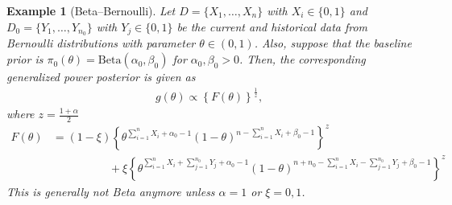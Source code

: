 \documentclass[12pt]{article}
\newtheorem{example}{Example}
\begin{document}
\begin{example}[Beta–Bernoulli]
    Let $D = \{X_1,\dots,X_n\}$ with $X_i \in \{0, 1\}$ and $D_0 = \{Y_1,\dots,Y_{n_0}\}$ with $Y_j \in \{0, 1\}$ be the current and historical data from Bernoulli distributions with parameter $\theta \in (0, 1)$.
    Also, suppose that the baseline prior is $\pi_0(\theta) = \mathrm{Beta}(\alpha_0, \beta_0)$ for $\alpha_0, \beta_0 > 0$.
    Then, the corresponding generalized power posterior is given as
    \begin{align*}
        g(\theta) \propto \left\{F(\theta)\right\}^{\frac{1}{z}},
    \end{align*}
    where $z = \frac{1 + \alpha}{2}$
    \begin{align*}
        F(\theta) &= (1 - \xi)\left\{\theta^{\sum^n_{i=1}X_i + \alpha_0 - 1}(1 - \theta)^{n - \sum^n_{i=1}X_i + \beta_0 - 1}\right\}^z \\
        &\quad\quad\quad\quad\quad + \xi\left\{\theta^{\sum^n_{i=1}X_i + \sum^{n_0}_{j=1}Y_j + \alpha_0 - 1}(1 - \theta)^{n + n_0 - \sum^n_{i=1}X_i - \sum^{n_0}_{j=1}Y_j + \beta_0 - 1}\right\}^z
    \end{align*}
    This is generally not Beta anymore unless $\alpha = 1$ or $\xi=0,1$.
\end{example}
\end{document}
